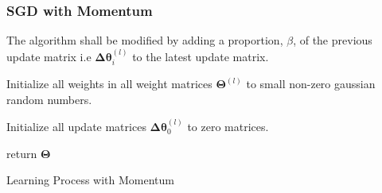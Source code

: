 \documentclass{article}
\begin{document}
\subsubsection{SGD with Momentum}

The algorithm shall be modified by adding a proportion, $\beta$, of the previous update matrix i.e $\boldsymbol{\Delta\theta}^{(l)}_i$ to the latest update matrix.

\begin{algorithm}[h]
		\SetAlgoLined
		
		Initialize all weights in all weight matrices $\boldsymbol\Theta^{(l)}$ to small non-zero gaussian random numbers.
		
		Initialize all update matrices $\boldsymbol{\Delta\theta}^{(l)}_0$ to zero matrices.
		
	return $\boldsymbol{\Theta}$
	\caption{Learning Process with Momentum}
\end{algorithm}
\hfill\newpage
\end{document}
